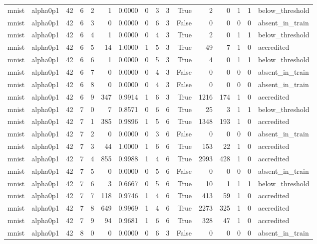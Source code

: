\begin{tabular}{llrrrrrrrrrrrrrl}
mnist & alpha0p1 & 42 & 6 & 2 & 1 & 0.0000 & 0 & 3 & 3 & True & 2 & 0 & 1 & 1 & below\_threshold \\
mnist & alpha0p1 & 42 & 6 & 3 & 0 & 0.0000 & 0 & 6 & 3 & False & 0 & 0 & 0 & 0 & absent\_in\_train \\
mnist & alpha0p1 & 42 & 6 & 4 & 1 & 0.0000 & 0 & 4 & 3 & True & 2 & 0 & 1 & 1 & below\_threshold \\
mnist & alpha0p1 & 42 & 6 & 5 & 14 & 1.0000 & 1 & 5 & 3 & True & 49 & 7 & 1 & 0 & accredited \\
mnist & alpha0p1 & 42 & 6 & 6 & 1 & 0.0000 & 0 & 5 & 3 & True & 4 & 0 & 1 & 1 & below\_threshold \\
mnist & alpha0p1 & 42 & 6 & 7 & 0 & 0.0000 & 0 & 4 & 3 & False & 0 & 0 & 0 & 0 & absent\_in\_train \\
mnist & alpha0p1 & 42 & 6 & 8 & 0 & 0.0000 & 0 & 4 & 3 & False & 0 & 0 & 0 & 0 & absent\_in\_train \\
mnist & alpha0p1 & 42 & 6 & 9 & 347 & 0.9914 & 1 & 6 & 3 & True & 1216 & 174 & 1 & 0 & accredited \\
mnist & alpha0p1 & 42 & 7 & 0 & 7 & 0.8571 & 0 & 6 & 6 & True & 25 & 3 & 1 & 1 & below\_threshold \\
mnist & alpha0p1 & 42 & 7 & 1 & 385 & 0.9896 & 1 & 5 & 6 & True & 1348 & 193 & 1 & 0 & accredited \\
mnist & alpha0p1 & 42 & 7 & 2 & 0 & 0.0000 & 0 & 3 & 6 & False & 0 & 0 & 0 & 0 & absent\_in\_train \\
mnist & alpha0p1 & 42 & 7 & 3 & 44 & 1.0000 & 1 & 6 & 6 & True & 153 & 22 & 1 & 0 & accredited \\
mnist & alpha0p1 & 42 & 7 & 4 & 855 & 0.9988 & 1 & 4 & 6 & True & 2993 & 428 & 1 & 0 & accredited \\
mnist & alpha0p1 & 42 & 7 & 5 & 0 & 0.0000 & 0 & 5 & 6 & False & 0 & 0 & 0 & 0 & absent\_in\_train \\
mnist & alpha0p1 & 42 & 7 & 6 & 3 & 0.6667 & 0 & 5 & 6 & True & 10 & 1 & 1 & 1 & below\_threshold \\
mnist & alpha0p1 & 42 & 7 & 7 & 118 & 0.9746 & 1 & 4 & 6 & True & 413 & 59 & 1 & 0 & accredited \\
mnist & alpha0p1 & 42 & 7 & 8 & 649 & 0.9969 & 1 & 4 & 6 & True & 2273 & 325 & 1 & 0 & accredited \\
mnist & alpha0p1 & 42 & 7 & 9 & 94 & 0.9681 & 1 & 6 & 6 & True & 328 & 47 & 1 & 0 & accredited \\
mnist & alpha0p1 & 42 & 8 & 0 & 0 & 0.0000 & 0 & 6 & 3 & False & 0 & 0 & 0 & 0 & absent\_in\_train \\

\end{tabular}
